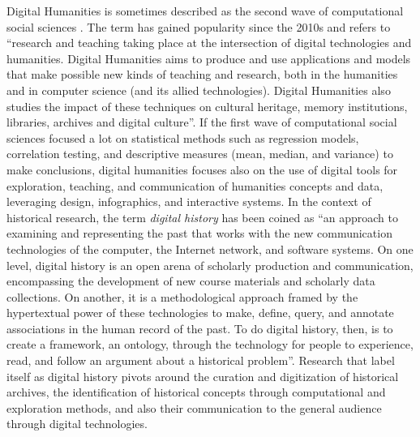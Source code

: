 Digital Humanities is sometimes described as the second wave of computational social sciences \cite{lemercierQuantitativeMethodsHumanities2019}.
The term has gained popularity since the 2010s and refers to ``research and teaching taking place at the intersection of digital technologies and humanities. Digital Humanities aims to produce and use applications and models that make possible new kinds of teaching and research, both in the humanities and
in computer science (and its allied technologies). Digital Humanities also studies the impact of these techniques on cultural heritage, memory institutions, libraries, archives and digital culture''\cite{terras2011quantifying}.
If the first wave of computational social sciences focused a lot on statistical methods such as regression models, correlation testing, and descriptive measures (mean, median, and variance) to make conclusions, digital humanities focuses also on the use of digital tools for exploration, teaching, and communication of humanities concepts and data, leveraging design, infographics, and interactive systems\cite{burdickDigitalHumanities2016}.
In the context of historical research, the term \textit{digital history} has been coined as ``an approach to examining and representing the past that works with the new communication technologies of the computer, the Internet network, and software systems. On one level, digital history is an open arena of scholarly production and communication, encompassing the development of new course materials and scholarly data collections. On another, it is a methodological approach framed by the hypertextual power of these technologies to make, define, query, and annotate associations in the human record of the past. To do digital history, then, is to create a framework, an ontology, through the technology for people to experience, read, and follow an argument about a historical problem''\cite{InterchangePromiseDigital2008}.
Research that label itself as digital history pivots around the curation and digitization of historical archives, the identification of historical concepts through computational and exploration methods, and also their communication to the general audience through digital technologies.
